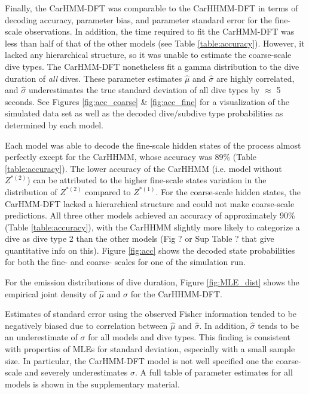 Finally, the CarHMM-DFT was comparable to the CarHHMM-DFT in terms of decoding accuracy, parameter bias, and parameter standard error for the fine-scale observations. In addition, the time required to fit the CarHMM-DFT was less than half of that of the other models (see Table \ref{table:accuracy}). However, it lacked any hierarchical structure, so it was unable to estimate the coarse-scale dive types. The CarHMM-DFT nonetheless fit a gamma distribution to the dive duration of \textit{all} dives. These parameter estimates $\hat \mu$ and $\hat \sigma$ are highly correlated, and $\hat \sigma$ underestimates the true standard deviation of all dive types by $\approx$ 5 seconds. See Figures \ref{fig:acc_coarse} \& \ref{fig:acc_fine} for a visualization of the simulated data set as well as the decoded dive/subdive type probabilities as determined by each model.






\iffalse
Each model was able to decode the fine-scale hidden states of the process almost perfectly except for the CarHHMM, whose accuracy was 89\% (Table \ref{table:accuracy}). The lower accuracy of the CarHHMM (i.e. model without $Z^{*(2)}$)  can be attributed to the higher fine-scale states variation in the distribution of $Z^{*(2)}$ compared to $Z^{*(1)}$. For the coarse-scale hidden states, the CarHMM-DFT lacked a hierarchical structure and could not make coarse-scale predictions. All three other models achieved an accuracy of approximately 90\% (Table \ref{table:accuracy}), with the CarHHMM slightly more likely to categorize a dive as dive type 2 than the other models (Fig ? or Sup Table ? that give quantitative info on this). Figure \ref{fig:acc} shows the decoded state probabilities for both the fine- and coarse- scales for one of the simulation run.

For the emission distributions of dive duration, Figure \ref{fig:MLE_dist} shows the empirical joint density of $\hat \mu$ and $\hat \sigma$ for the CarHHMM-DFT.

Estimates of standard error using the observed Fisher information tended to be negatively biased due to correlation between $\hat \mu$ and $\hat \sigma$. In addition, $\hat \sigma$ tends to be an underestimate of $\sigma$ for all models and dive types. This finding is consistent with properties of MLEs for standard deviation, especially with a small sample size. In particular, the CarHMM-DFT model is not well specified one the coarse-scale and severely underestimates $\sigma$. %
A full table of parameter estimates for all models is shown in the supplementary material.


